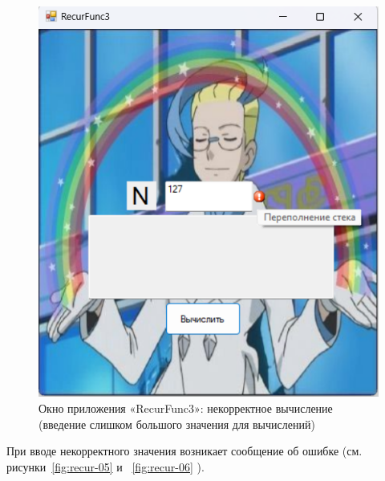\documentclass[bachelor, och, pract, times]{SCWorks}
\begin{document}
\begin{figure}[H]
    \centering
    \includegraphics[scale=0.7]{Скрины/Снимок экрана 2025-01-03 221826.png}
    \caption{Окно приложения «RecurFunc3»: некорректное вычисление
    (введение слишком большого значения для вычислений)}\label{fig:recur-04}
\end{figure}

\vspace{11cm}

При вводе некорректного значения возникает сообщение об ошибке (см.
рисунки~\ref{fig:recur-05} и ~\ref{fig:recur-06} ).
\end{document}
